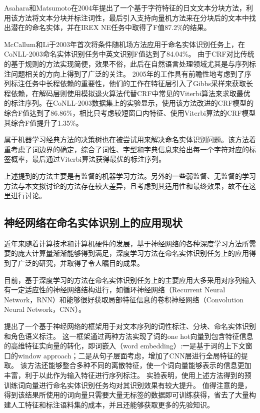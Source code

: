 Asahara和Matsumoto\citep{asahara2003japanese}在2004年提出了一个基于字符特征的日文文本分块方法，利用该方法将文本分块并标注词性，最后引入支持向量机方法来在分块后的文本中找出潜在的命名实体，并在IREX NE任务中取得了F值87.2\%的结果。

McCallum和Li\citep{mccallum2003early}于2003年首次将条件随机场方法应用于命名实体识别任务上，在CoNLL-2003命名实体识别任务中英文识别F值达到了84.04\%。
由于CRF对比传统的基于规则的方法实现简便，效果不俗，此后在自然语言处理领域尤其是与序列标注问题相关的方向上得到了广泛的关注。
2005年\citet{finkel2005incorporating}的工作具有前瞻性地考虑到了序列标注任务中长程依赖的重要性，他们的工作在特征层引入了Gibbs采样来获取长程依赖，在解码层则使用模拟退火算法代替CRF中常见的Viterbi算法来求取最优的标注序列。在CoNLL-2003数据集上的实验显示，使用该方法改进的CRF模型的综合F值达到了86.86\%，相比只考虑较短窗口内特征、使用Viterbi算法的CRF模型其综合F值提升了1.35\%。

属于机器学习经典方法的决策树也在被\citet{sekine1998decision}尝试用来解决命名实体识别问题。该方法着重考虑了词边界的确定，综合了词性、字型和字典信息来给出每一个字符对应的标签概率，最后通过Viterbi算法获得最优的标注序列。

上述提到的方法主要是有监督的机器学习方法。另外的一些弱监督、无监督的学习方法与本文拟讨论的方法存在较大差异，且考虑到其适用性和最终效果，故不在这里进行讨论。

\subsection{神经网络在命名实体识别上的应用现状}
近年来随着计算技术和计算机硬件的发展，基于神经网络的各种深度学习方法所需要的庞大计算量渐渐能够得到满足，深度学习方法在命名实体识别任务上的应用得到了广泛的研究，并取得了令人瞩目的成果。

目前，基于深度学习的方法在命名实体识别任务上的主要应用大多采用对序列输入有一定适应性的神经网络结构进行，如循环神经网络（Recurrent Neural Network，RNN）和能够很好获取局部特征信息的卷积神经网络（Convolution Neural Network，CNN）。

\citet{collobert2011natural}提出了一个基于神经网络的框架用于对文本序列的词性标注、分块、命名实体识别和角色语义标注。
这一框架通过两种方法实现了词的one hot向量到包含特征信息的高维特征实向量的转化，即词嵌入（word embedding）:一是基于词的上下文窗口的window approach；二是从句子层面考虑，增加了CNN层进行全局特征的提取。
该方法还能够整合多种不同的离散特征，使一个词向量能够表示的信息更加丰富，利于以此作为输入特征进行序列标注。
实验表明，使用上述方法得到的预训练词向量进行命名实体识别任务均对其识别效果有较大提升。
值得注意的是，得到该结果所使用的词向量只需要大量无标签的数据即可训练获得，省去了大量构建人工特征和标注语料集的成本，并且还能够获取更多的先验知识。

